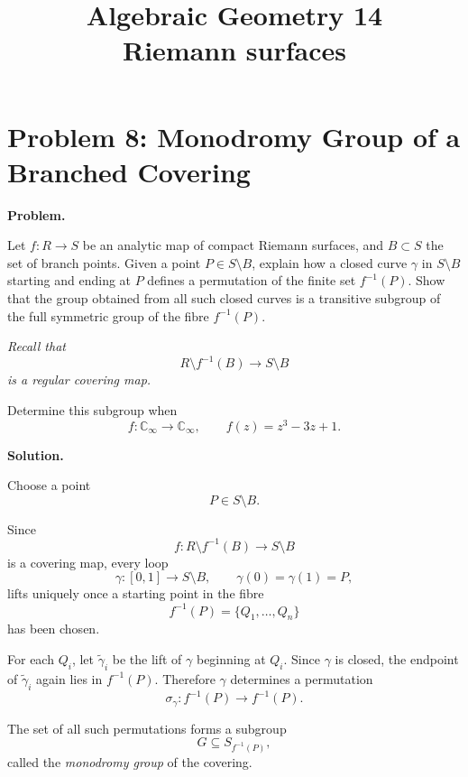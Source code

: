 \documentclass[12pt,a4paper]{article}
\theoremstyle{notespace}
\begin{document}
\title{Algebraic Geometry 14\\
	\large Riemann surfaces}
\author{}
\date{}

	\maketitle
	

	\setcounter{section}{0}

\tableofcontents

	\clearpage
	
\section{Problem 8: Monodromy Group of a Branched Covering}

\textbf{Problem.}

Let \(f:R\to S\) be an analytic map of compact Riemann surfaces, and
\(B\subset S\) the set of branch points. Given a point
\(P\in S\setminus B\), explain how a closed curve \(\gamma\) in
\(S\setminus B\) starting and ending at \(P\) defines a permutation of
the finite set \(f^{-1}(P)\). Show that the group obtained from all such
closed curves is a transitive subgroup of the full symmetric group of
the fibre \(f^{-1}(P)\).

\emph{Recall that}
\[
R\setminus f^{-1}(B)\to S\setminus B
\]
\emph{is a regular covering map.}

Determine this subgroup when
\[
f:\mathbb C_\infty\to\mathbb C_\infty,
\qquad
f(z)=z^3-3z+1.
\]

\bigskip

\textbf{Solution.}

Choose a point
\[
P\in S\setminus B.
\]

Since
\[
f:R\setminus f^{-1}(B)\longrightarrow S\setminus B
\]
is a covering map, every loop
\[
\gamma:[0,1]\to S\setminus B,
\qquad
\gamma(0)=\gamma(1)=P,
\]
lifts uniquely once a starting point in the fibre
\[
f^{-1}(P)=\{Q_1,\ldots,Q_n\}
\]
has been chosen.

For each \(Q_i\), let \(\widetilde{\gamma}_i\) be the lift of
\(\gamma\) beginning at \(Q_i\). Since \(\gamma\) is closed, the endpoint
of \(\widetilde{\gamma}_i\) again lies in \(f^{-1}(P)\). Therefore
\(\gamma\) determines a permutation
\[
\sigma_\gamma:f^{-1}(P)\to f^{-1}(P).
\]

The set of all such permutations forms a subgroup
\[
G\subseteq S_{f^{-1}(P)},
\]
called the \emph{monodromy group} of the covering.
\end{document}
